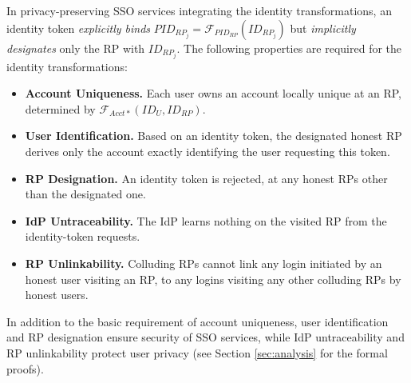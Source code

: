 In privacy-preserving SSO services integrating the identity transformations,
    an identity token \emph{explicitly binds} $PID_{RP_j} = \mathcal{F}_{PID_{RP}}(ID_{RP_j})$ but \emph{implicitly designates} only the RP with $ID_{RP_j}$.
The following properties are required for the identity transformations:
\begin{itemize}
\setlength{\topsep}{0pt}
\setlength{\partopsep}{0pt}
\setlength{\itemsep}{0pt}
\setlength{\parsep}{0pt}
\setlength{\parskip}{0pt}

\item \textbf{Account Uniqueness.} Each user owns an account locally unique at an RP, determined by $\mathcal{F}_{Acct\ast}(ID_{U}, ID_{RP})$.
\item \textbf{User Identification.} Based on an identity token,
    the designated honest RP derives only the account exactly identifying the user requesting this token.
\item \textbf{RP Designation.} 
An identity token is rejected, at any honest RPs other than the designated one.

\item \textbf{IdP Untraceability.}
The IdP learns nothing on the visited RP from the identity-token requests.

\item \textbf{RP Unlinkability.}
Colluding RPs 
 cannot link any login initiated by an honest user visiting an RP,
  to any logins visiting any other colluding RPs by honest users.
\end{itemize}

In addition to the basic requirement of account uniqueness,
    user identification and RP designation ensure security of SSO services,
    while IdP untraceability and RP unlinkability protect user privacy
(see Section \ref{sec:analysis} for the formal proofs). 